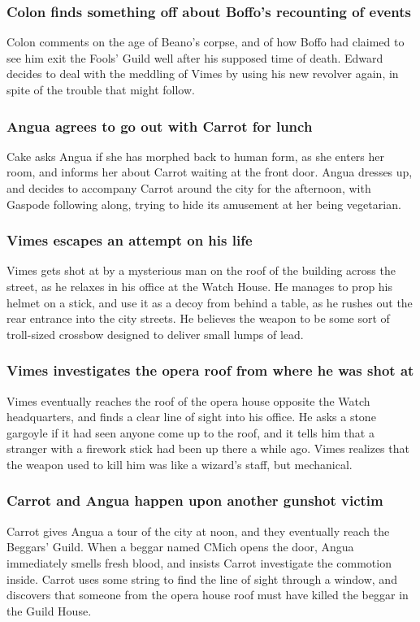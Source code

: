 \subsubsection{\Gls{Colon} finds something off about \Gls{Boffo}'s recounting of events}
\Gls{Colon} comments on the age of \Gls{Beano}'s corpse, and of how \Gls{Boffo} had claimed to see
him exit the Fools' Guild well after his supposed time of death. \Gls{Edward} decides to deal with
the meddling of \Gls{Vimes} by using his new revolver again, in spite of the trouble that might
follow.

\subsubsection{\Gls{Angua} agrees to go out with \Gls{Carrot} for lunch}
\Gls{Cake} asks \Gls{Angua} if she has morphed back to human form, as she enters her room, and
informs her about \Gls{Carrot} waiting at the front door. \Gls{Angua} dresses up, and decides to
accompany \Gls{Carrot} around the city for the afternoon, with \Gls{Gaspode} following along, trying
to hide its amusement at her being vegetarian.

\subsubsection{\Gls{Vimes} escapes an attempt on his life}
\Gls{Vimes} gets shot at by a mysterious man on the roof of the building across the street, as he
relaxes in his office at the Watch House. He manages to prop his helmet on a stick, and use it as a
decoy from behind a table, as he rushes out the rear entrance into the city streets. He believes
the weapon to be some sort of troll-sized crossbow designed to deliver small lumps of lead.

\subsubsection{\Gls{Vimes} investigates the opera roof from where he was shot at}
\Gls{Vimes} eventually reaches the roof of the opera house opposite the Watch headquarters, and
finds a clear line of sight into his office. He asks a stone gargoyle if it had seen anyone come up
to the roof, and it tells him that a stranger with a firework stick had been up there a while ago.
\Gls{Vimes} realizes that the weapon used to kill him was like a wizard's staff, but mechanical.

\subsubsection{\Gls{Carrot} and \Gls{Angua} happen upon another gunshot victim}
\Gls{Carrot} gives \Gls{Angua} a tour of the city at noon, and they eventually reach the Beggars'
Guild. When a beggar named \Gls{CMich} opens the door, \Gls{Angua} immediately smells fresh blood,
and insists \Gls{Carrot} investigate the commotion inside. \Gls{Carrot} uses some string to find
the line of sight through a window, and discovers that someone from the opera house roof must have
killed the beggar in the Guild House.

